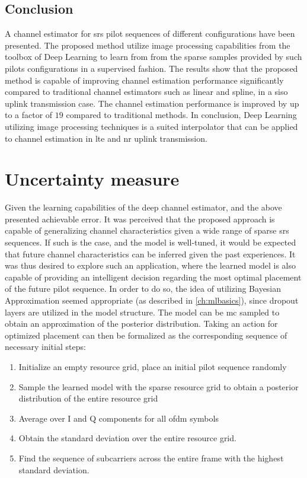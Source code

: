 \subsection{Conclusion}
A channel estimator for \gls{srs} pilot sequences of different configurations have been presented. The proposed method utilize image processing capabilities from the toolbox of Deep Learning to learn from from the sparse samples provided by such pilots configurations in a supervised fashion. The results show that the proposed method is capable of improving channel estimation performance significantly compared to traditional channel estimators such as linear and spline, in a \gls{siso} uplink transmission case. The channel estimation performance is improved by up to a factor of $19$ compared to traditional methods. In conclusion, Deep Learning utilizing image processing techniques is a suited interpolator that can be applied to channel estimation in \gls{lte} and \gls{nr} uplink transmission.

\section{Uncertainty measure}
Given the learning capabilities of the deep channel estimator, and the above presented achievable error. It was perceived that the proposed approach is capable of generalizing channel characteristics given a wide range of sparse \gls{srs} sequences. If such is the case, and the model is well-tuned, it would be expected that future channel characteristics can be inferred given the past experiences. It was thus desired to explore such an application, where the learned model is also capable of providing an intelligent decision regarding the most optimal placement of the future pilot sequence. In order to do so, the idea of utilizing Bayesian Approximation seemed appropriate (as described in \ref{ch:mlbasics}), since dropout layers are utilized in the model structure. The model can be \gls{mc} sampled to obtain an approximation of the posterior distribution. Taking an action for optimized placement can then be formalized as the corresponding sequence of necessary initial steps:

\begin{enumerate}
    \item Initialize an empty resource grid, place an initial pilot sequence randomly
    \item Sample the learned model with the sparse resource grid to obtain a posterior distribution of the entire resource grid
    \item Average over I and Q components for all \gls{ofdm} symbols
    \item Obtain the standard deviation over the entire resource grid.
    \item Find the sequence of subcarriers across the entire frame with the highest standard deviation.
\end{enumerate}

